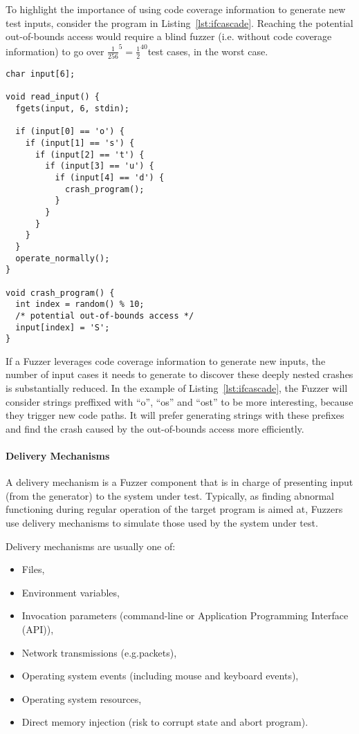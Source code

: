 To highlight the importance of using code coverage information to generate new test inputs, consider the program in
Listing~\ref{lst:ifcascade}. Reaching the potential out-of-bounds access would require a blind fuzzer (i.e. without code coverage
information) to go over ${\frac{1}{256}}^{5} = {\frac{1}{2}}^{40}$test cases, in the worst case. %
\newpage

\begin{lstlisting}[caption={If-Cascade Program}, label={lst:ifcascade},  style=CStyle, float, floatplacement=H]
char input[6];

void read_input() {
  fgets(input, 6, stdin);

  if (input[0] == 'o') {
    if (input[1] == 's') {
      if (input[2] == 't') {
        if (input[3] == 'u') {
          if (input[4] == 'd') {
            crash_program();
          }
        }
      }
    }
  }
  operate_normally();
}

void crash_program() {
  int index = random() % 10;
  /* potential out-of-bounds access */
  input[index] = 'S';
}
\end{lstlisting}

If a Fuzzer leverages code coverage information to generate new inputs, the number of input cases it needs to generate
to discover these deeply nested crashes is substantially reduced. In the example of Listing~\ref{lst:ifcascade}, the Fuzzer will consider strings preffixed
with ``o'', ``os'' and ``ost'' to be more interesting, because they trigger new code paths. It will prefer generating strings with these prefixes and
find the crash caused by the out-of-bounds access more efficiently.


\paragraph{Delivery Mechanisms}

A delivery mechanism is a Fuzzer component that is in charge of presenting input (from the generator)
to the system under test. Typically, as finding abnormal functioning during regular operation of the target program is aimed at, Fuzzers use delivery mechanisms to simulate those used by the system under test\cite{mcnallyFuzzingStateArt2012}.

Delivery mechanisms are usually one of:

\begin{itemize}
    \item Files,
    \item Environment variables,
    \item Invocation parameters (command-line or Application Programming Interface (API)),
    \item Network transmissions (e.g.\@ packets),
    \item Operating system events (including mouse and keyboard events),
    \item Operating system resources,
    \item Direct memory injection (risk to corrupt state and abort program).
\end{itemize}

